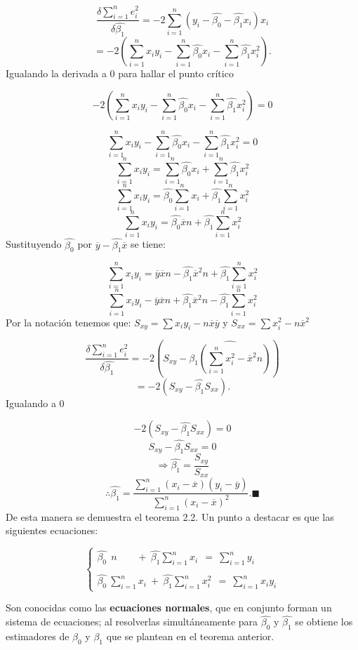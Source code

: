 \documentclass[
  a4paper,
  oneside,
  openany]{book}
\begin{document}
\[\frac{\delta\sum_{i=1}^{n}e_{i}^2}{\delta\hat{\beta_{1}}}=-2\sum_{i=1}^{n}(y_{i}-\hat{\beta_{0}}-\hat{\beta_{1}}x_{i})x_{i}\]
\[=-2\left(\sum_{i=1}^{n}x_{i}y_{i}-\sum_{i=1}^{n}\hat{\beta_{0}}x_{i}-\sum_{i=1}^{n}\hat{\beta_{1}}x_{i}^2\right).\]
Igualando la derivada a 0 para hallar el punto crítico

\[-2\left(\sum_{i=1}^{n}x_{i}y_{i}-\sum_{i=1}^{n}\hat{\beta_{0}}x_{i}-\sum_{i=1}^{n}\hat{\beta_{1}}x_{i}^2\right)=0\]

\[\sum_{i=1}^{n}x_{i}y_{i}-\sum_{i=1}^{n}\hat{\beta_{0}}x_{i}-\sum_{i=1}^{n}\hat{\beta_{1}}x_{i}^2=0\]
\[\sum_{i=1}^{n}x_{i}y_{i}=\sum_{i=1}^{n}\hat{\beta_{0}}x_{i}+\sum_{i=1}^{n}\hat{\beta_{1}}x_{i}^2\]
\[\sum_{i=1}^{n}x_{i}y_{i}=\hat{\beta_{0}}\sum_{i=1}^{n}x_{i}+\hat{\beta_{1}}\sum_{i=1}^{n}x_{i}^2\]
\[\sum_{i=1}^{n}x_{i}y_{i}=\hat{\beta_{0}}\overline{x}n+\hat{\beta_{1}}\sum_{i=1}^{n}x_{i}^2\]
Sustituyendo \(\hat{\beta_{0}}\) por \(\overline{y}-\hat{\beta_{1}}\overline{x}\) se tiene:

\[\sum_{i=1}^{n}x_{i}y_{i}=\overline{y}\overline{x}n-\hat{\beta_{1}}\overline{x}^2n+\hat{\beta_{1}}\sum_{i=1}^{n}x_{i}^2\]
\[\sum_{i=1}^{n}x_{i}y_{i}-\overline{y}\overline{x}n+\hat{\beta_{1}}\overline{x}^2n-\hat{\beta_{1}}\sum_{i=1}^{n}x_{i}^2\]
Por la notación tenemos que: \(S_{xy}=\sum x_{i}y_{i} - n \overline{x}\overline{y}\) y \(S_{xx}= \sum x_{i}^2 - n\overline{x}^2\)

\[\frac{\delta \sum_{i=1}^{n}e_{i}^2}{\delta\hat{\beta_{1}}}=-2\left(S_{xy}-\hat{\beta_{1}\left(\sum_{i=1}^{n}x_{i}^2-\overline{x}^2n\right)}\right)\]
\[=-2(S_{xy}-\hat{\beta_{1}}S_{xx}).\]
Igualando a 0

\[-2(S_{xy}-\hat{\beta_{1}}S_{xx})=0\]
\[S_{xy}-\hat{\beta_{1}}S_{xx}=0\]
\[\Rightarrow \hat{\beta_{1}}=\frac{S_{xy}}{S_{xx}}\]
\[\therefore \hat{\beta_{1}}=\frac{\sum_{i=1}^{n}(x_{i}-\overline{x})(y_{i}-\overline{y})}{\sum_{i=1}^{n}(x_{i}-\overline{x})^2}.\blacksquare\]
De esta manera se demuestra el teorema 2.2. Un punto a destacar es que las siguientes ecuaciones:

\[
\left\{
\begin{array}{ll} \hat{\beta_{0}} \ \ n  \ \ \  \ \ \ \ \ \ + \ \hat{\beta_{1}}\sum_{i=1}^{n}x_{i}\  \ = \ \sum_{i=1}^{n}y_{i} \\
\\
\hat{\beta_{0}} \ \sum_{i=1}^{n}x_{i} \ + \ \hat{\beta_{1}}\sum_{i=1}^{n}x_{i}^2 \ \ = \ \sum_{i=1}^{n}x_{i}y_{i}
\end{array}
\right. 
\]

Son conocidas como las \textbf{ecuaciones normales}, que en conjunto forman un sistema de ecuaciones; al resolverlas simultáneamente para \(\hat{\beta_{0}}\) y \(\hat{\beta_{1}}\) se obtiene los estimadores de \(\beta_{0}\) y \(\beta_{1}\) que se plantean en el teorema anterior.
\end{document}
